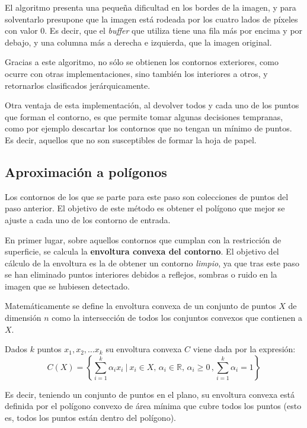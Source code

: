 El algoritmo presenta una pequeña dificultad en los bordes de la imagen, y para solventarlo presupone que la imagen está rodeada por los cuatro lados de píxeles con valor 0. Es decir, que el \textit{buffer} que utiliza tiene una fila más por encima y por debajo, y una columna más a derecha e izquierda, que la imagen original.

Gracias a este algoritmo, no sólo se obtienen los contornos exteriores, como ocurre con otras implementaciones, sino también los interiores a otros, y retornarlos clasificados jerárquicamente. 

Otra ventaja de esta implementación, al devolver todos y cada uno de los puntos que forman el contorno, es que permite tomar algunas decisiones tempranas, como por ejemplo descartar los contornos que no tengan un mínimo de puntos. Es decir, aquellos que no son susceptibles de formar la hoja de papel. 

\subsection{Aproximación a polígonos}
Los contornos de los que se parte para este paso son colecciones de puntos del paso anterior. El objetivo de este método es obtener el polígono que mejor se ajuste a cada uno de los contorno de entrada.
 
En primer lugar, sobre aquellos contornos que cumplan con la restricción de superficie, se calcula la \textbf{envoltura convexa del contorno}. El objetivo del cálculo de la envoltura es la de obtener un contorno \emph{limpio}, ya que tras este paso se han eliminado puntos interiores debidos a reflejos, sombras o ruido en la imagen que se hubiesen detectado.

Matemáticamente se define la envoltura convexa de un conjunto de puntos $X$ de dimensión $n$ como la intersección de todos los conjuntos convexos que contienen a $X$. 

Dados $k$ puntos $x_1, x_2,\dots x_k$ su envoltura convexa $C$ viene dada por la expresión:
\begin{equation}
C(X) =\left\{\sum_{i=1}^k \alpha_i x_i \ \Bigg | \ x_i\in X, \, \alpha_i\in \mathbb{R}, \, \alpha_i \geq 0 \, , \sum_{i=1}^k \alpha_i=1\right\}
\end{equation}

Es decir, teniendo un conjunto de puntos en el plano, su envoltura convexa está definida por el polígono convexo de área mínima que cubre todos los puntos (esto es, todos los puntos están dentro del polígono). 

